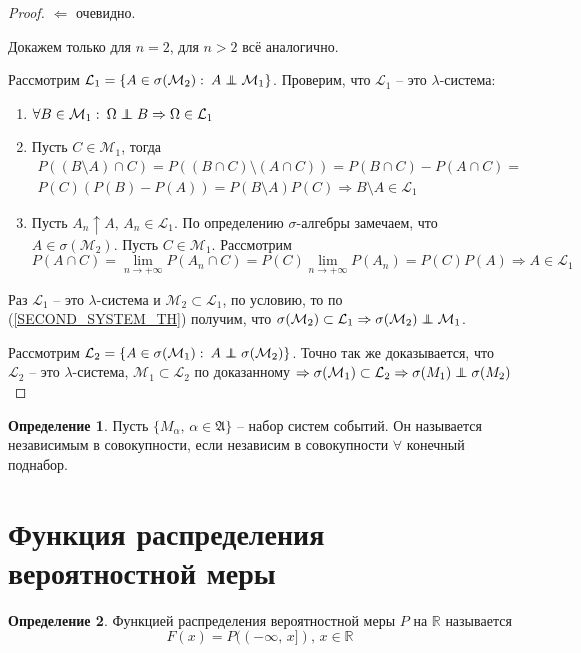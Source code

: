 \documentclass[a4paper,12pt]{article}
\newcommand\independent{\protect\mathpalette{\protect\independenT}{\perp}}
\def\independenT#1#2{\mathrel{\rlap{$#1#2$}\mkern2mu{#1#2}}}
\theoremstyle{plain}
\theoremstyle{definition}
\newtheorem{definition}{Определение}[section]
\theoremstyle{remark}
\begin{document}
\begin{proof}
	$\Leftarrow$ очевидно.

	Докажем только для $n = 2$, для $n > 2$ всё аналогично.

	Рассмотрим $\mathcal{L}_1 = \{A \in \sigma(\mathcal{M}_2):\: A \independent \mathcal{M}_1\}$. Проверим, что $\mathcal{L}_1$ -- это $\lambda$-система:
	\begin{enumerate}
		\item $\forall B \in \mathcal{M}_1 :\: \Omega \independent B \Rightarrow \Omega \in \mathcal{L}_1$
		\item Пусть $C \in \mathcal{M}_1$, тогда
		      \begin{align*}
			      P((B \setminus A) \cap C) = P((B \cap C) \setminus (A \cap C)) = P(B \cap C) - P(A \cap C) = \\
			      P(C)(P(B) - P(A)) = P(B \setminus A)P(C) \Rightarrow B \setminus A \in \mathcal{L}_1
		      \end{align*}
		\item Пусть $A_n \uparrow A,\, A_n \in \mathcal{L}_1$. По определению $\sigma$-алгебры замечаем, что $A \in \sigma(\mathcal{M}_2)$. Пусть $C \in \mathcal{M}_1$. Рассмотрим
		      \[P(A \cap C) = \lim_{n \to +\infty} P(A_n \cap C) = P(C)\lim_{n \to +\infty}P(A_n) = P(C)P(A) \Rightarrow A \in \mathcal{L}_1\]
	\end{enumerate}
	Раз $\mathcal{L}_1$ -- это $\lambda$-система и $\mathcal{M}_2 \subset \mathcal{L}_1$, по условию, то по (\ref{SECOND_SYSTEM_TH}) получим, что $\sigma(\mathcal{M}_2) \subset \mathcal{L}_1 \Rightarrow \sigma(\mathcal{M}_2) \independent \mathcal{M}_1$.

	Рассмотрим $\mathcal{L}_2 = \{A \in \sigma(\mathcal{M}_1):\: A \independent \sigma(\mathcal{M}_2)\}$. Точно так же доказывается, что $\mathcal{L}_2$ -- это $\lambda$-система, $\mathcal{M}_1 \subset \mathcal{L}_2$ по доказанному $\Rightarrow \sigma(\mathcal{M}_1) \subset \mathcal{L}_2 \Rightarrow \sigma(M_1) \independent \sigma(M_2)$
\end{proof}

\begin{definition}
	Пусть $\{M_\alpha,\, \alpha \in \mathfrak{A}\}$ -- набор систем событий. Он называется независимым в совокупности, если независим в совокупности $\forall$ конечный поднабор.
\end{definition}

\section{Функция распределения вероятностной меры}
\begin{definition}
	Функцией распределения вероятностной меры $P$ на $\mathbb{R}$ называется
	\[F(x) = P((-\infty,\, x]),\, x \in \mathbb{R}\]
\end{definition}
\end{document}
